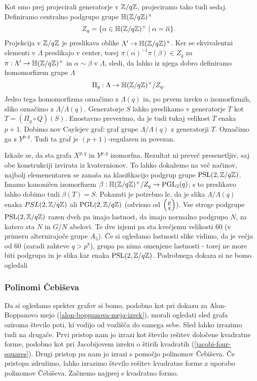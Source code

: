 Kot smo prej projecirali generatorje v \(\mathbb Z/q\mathbb Z\), projeciramo tako tudi sedaj. Definiramo centralno podgrupo grupe \(\mathbb H(\mathbb Z/q\mathbb Z)^\times\)
\begin{align*}
    Z_q = \{\alpha \in \mathbb H(\mathbb Z/q\mathbb Z)^\times \mid \alpha = \overline\alpha\}.
\end{align*}
Projekcija v \(\mathbb Z/q\mathbb Z\) je preslikava oblike \(\Lambda' \to\mathbb H(\mathbb Z/q\mathbb Z)^\times\). Ker se ekvivalentni elementi v \(\Lambda\) preslikajo v center, torej \(\pi(\alpha)^{-1}\pi(\beta)\in Z_q\) za \(\pi:\Lambda' \to\mathbb H(\mathbb Z/q\mathbb Z)^\times\) in \(\alpha\sim\beta\) v \(\Lambda\), sledi, da lahko iz njega dobro definiramo homomorfizem grupe \(\Lambda\)
\begin{align*}
    \Pi_q: \Lambda \to \mathbb H(\mathbb Z/q\mathbb Z)^\times/Z_q.
\end{align*}
Jedro tega homomorfizma označimo z \(\Lambda(q)\) in, po prvem izreku o izomorfizmih, sliko označimo z \(\Lambda/\Lambda(q)\). Generatorje \(S\) lahko preslikamo v generatorje \(T\) kot \(T=(\Pi_q \circ Q)(S)\). Enostavno preverimo, da je tudi tukaj velikost \(T\) enaka \(p+1\). Dobimo nov Caylejev graf: graf grupe \(\Lambda/\Lambda(q)\) z generatorji \(T\). Označimo ga z \(Y^{p,q}\). Tudi ta graf je \((p+1)\)-regularen in povezan.

Izkaže se, da sta grafa \(X^{p,q}\) in \(Y^{p,q}\) izomorfna. Rezultat ni preveč presenetljiv, saj obe konstrukciji izvirata iz kvaternionov. To lahko dokažemo na več načinov, najbolj elemenentaren se zanaša na klasifikacijo podgrup grupe \(\operatorname{PSL}(2, \mathbb Z/q\mathbb Z)\). Imamo kanoničen izomorfizem \(\beta:\mathbb H(\mathbb Z/q\mathbb Z)^\times /Z_q\to \operatorname{PGL}_2(q)\); s to preslikavo lahko dobimo tudi \(\beta(T)=S\). Pokazati je potrebno le, da je slika \(\Lambda/\Lambda(q)\) enaka \(PSL(2, \mathbb Z/q\mathbb Z)\) ali \(\operatorname{PGL}(2, \mathbb Z/q\mathbb Z)\) (odvisno od \(\left(\frac{p}{q}\right)\)).  Vse stroge podgrupe \(\operatorname{PSL}(2, \mathbb Z/q\mathbb Z)\) razen dveh pa imajo lastnost, da imajo normalno podgrupo \(N\), za katero sta \(N\) in \(G/N\) abelovi. Te dve izjemi pa sta kvečjemu velikosti 60 (v primeru alternirajoče grupe \(A_5\)). Če si ogledamo lastnosti slike vidimo, da je večja od \(60\) (zaradi zahteve \(q>p^8\)), grupa pa nima omenjene lastnosti - torej ne more biti podgrupa in je slika kar enaka \(\operatorname{PSL}(2, \mathbb Z/q\mathbb Z)\). Podrobnega dokaza si ne bomo ogledali

\subsubsection{Polinomi Čebiševa}
Da si ogledamo spekter grafov si bomo, podobno kot pri dokazu za Alon-Boppanovo mejo (\ref{alon-boppanova-meja-izrek}), morali ogledati sled grafa oziroma število poti, ki vodijo od vozlišča do samega sebe. Sled lahko izrazimo tudi na drugače. Prvi pristop nam jo izrazi kot število rešitev določene kvadratne forme, podobno kot pri Jacobijovem izreku o štirih kvadratih (\ref{jacobi-four-squares}). Drugi pristop pa nam jo izrazi s pomočjo polinomov Čebiševa. Če pristopa združimo, lahko izrazimo število rešitev kvadratne forme z uporabo polinomov Čebiševa. Začnemo najprej s kvadratno formo.

